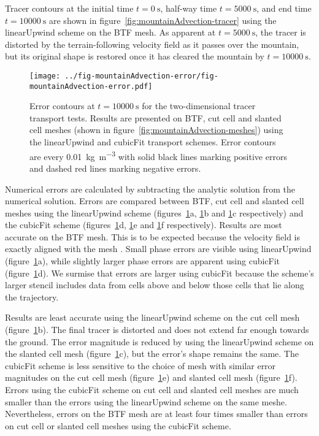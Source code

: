 Tracer contours at the initial time $t=\SI{0}{\second}$, half-way time $t=\SI{5000}{\second}$, and end time $t=\SI{10000}{\second}$ are shown in figure~\ref{fig:mountainAdvection-tracer} using the linearUpwind scheme on the BTF mesh.  As apparent at $t=\SI{5000}{\second}$, the tracer is distorted by the terrain-following velocity field as it passes over the mountain, but its original shape is restored once it has cleared the mountain by $t=\SI{10000}{\second}$.

\begin{figure}
	\centering
	\texttt{[image: ../fig-mountainAdvection-error/fig-mountainAdvection-error.pdf]}
	\caption{Error contours at $t=\SI{10000}{\second}$ for the two-dimensional tracer transport tests.  Results are presented on BTF, cut cell and slanted cell meshes (shown in figure~\ref{fig:mountainAdvection-meshes}) using the linearUpwind and cubicFit transport schemes.  Error contours are every \SI{0.01}{\kilo\gram\per\meter\cubed} with solid black lines marking positive errors and dashed red lines marking negative errors.}
	\label{fig:mountainAdvection-errors}
\end{figure}

Numerical errors are calculated by subtracting the analytic solution from the numerical solution.  Errors are compared between BTF, cut cell and slanted cell meshes using the linearUpwind scheme (figures~\ref{fig:mountainAdvection-errors}a, \ref{fig:mountainAdvection-errors}b and \ref{fig:mountainAdvection-errors}c respectively) and the cubicFit scheme (figures~\ref{fig:mountainAdvection-errors}d, \ref{fig:mountainAdvection-errors}e and \ref{fig:mountainAdvection-errors}f respectively).
Results are most accurate on the BTF mesh.  This is to be expected because the velocity field is exactly aligned with the mesh \citep{shaw-weller2016}.   Small phase errors are visible using linearUpwind (figure~\ref{fig:mountainAdvection-errors}a), while slightly larger phase errors are apparent using cubicFit (figure~\ref{fig:mountainAdvection-errors}d).
We surmise that errors are larger using cubicFit because the scheme's larger stencil includes data from cells above and below those cells that lie along the trajectory.

Results are least accurate using the linearUpwind scheme on the cut cell mesh (figure~\ref{fig:mountainAdvection-errors}b).  The final tracer is distorted and does not extend far enough towards the ground.  The error magnitude is reduced by using the linearUpwind scheme on the slanted cell mesh (figure~\ref{fig:mountainAdvection-errors}c), but the error's shape remains the same.
The cubicFit scheme is less sensitive to the choice of mesh with similar error magnitudes on the cut cell mesh (figure~\ref{fig:mountainAdvection-errors}e) and slanted cell mesh (figure~\ref{fig:mountainAdvection-errors}f).  Errors using the cubicFit scheme on cut cell and slanted cell meshes are much smaller than the errors using the linearUpwind scheme on the same meshe.  Nevertheless, errors on the BTF mesh are at least four times smaller than errors on cut cell or slanted cell meshes using the cubicFit scheme.

